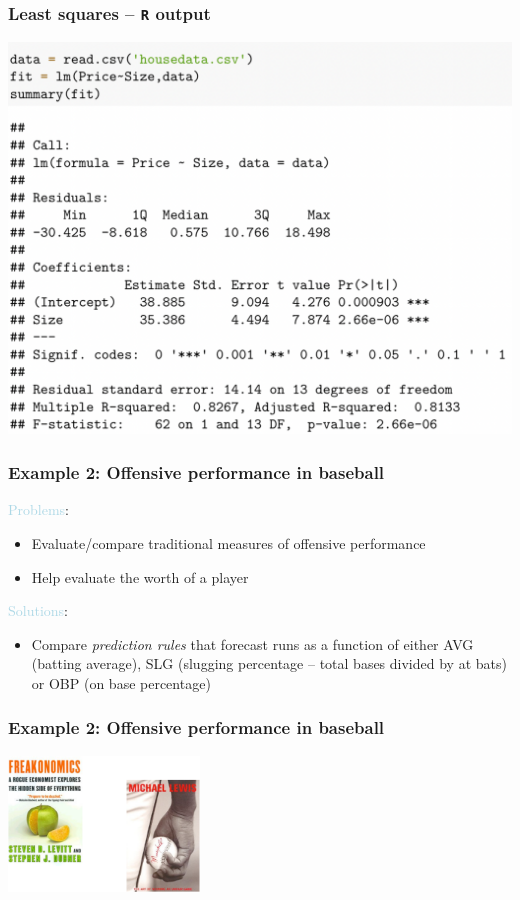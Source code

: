 \documentclass{beamer}
\newcommand{\bo}[1]{\textcolor{burntorange}{#1}}
\newcommand{\lb}[1]{\textcolor{lightblue}{#1}}
\newcommand{\bi}{\begin{itemize}}
\newcommand{\ib}{\end{itemize}}
\newcommand{\sk}{\vspace{.5cm}}
\begin{document}
\begin{frame}
\frametitle{Least squares -- {\tt R} output} 

\includegraphics[scale=0.50]{figures/pred1}

\end{frame}




\begin{frame}
\frametitle{Example 2: Offensive performance in baseball} 


{\lb{Problems}}:
\bi
\item Evaluate/compare traditional measures of offensive performance
\item Help evaluate the worth of a player
\ib

\sk
\sk

{\lb {Solutions}}:
\bi
\item Compare {\bo{ \it prediction rules}} that forecast runs as a function of either \bo{AVG} (batting average), \bo{SLG} (slugging percentage -- {\small total bases divided by at bats}) or \bo{OBP} (on base percentage)
\ib


\end{frame}




\begin{frame}
\frametitle{Example 2: Offensive performance in baseball} 

\begin{center}
\includegraphics[width=2in]{figures/Moneyball.pdf}
\end{center}
\end{frame}
\end{document}
